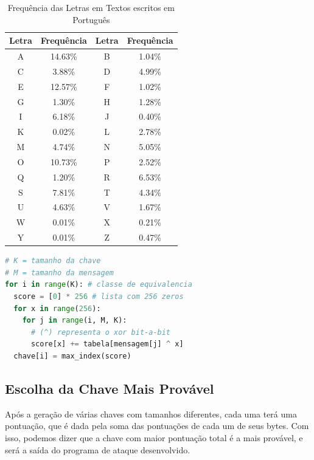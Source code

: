 \documentclass[conference]{IEEEtran}
\begin{document}
\begin{table}[htbp]
\caption{Frequência das Letras em Textos escritos em Português}
\begin{center}
\begin{tabular}{|c|c|c|c|}
\hline
    Letra & Frequência & Letra & Frequência \\
\hline
    A & 14.63\% & B & 1.04\% \\
    C & 3.88\% & D & 4.99\% \\
    E & 12.57\% & F & 1.02\% \\
    G & 1.30\% & H & 1.28\% \\
    I & 6.18\% & J & 0.40\% \\
    K & 0.02\% & L & 2.78\% \\
    M & 4.74\% & N & 5.05\% \\
    O & 10.73\% & P & 2.52\% \\
    Q & 1.20\% & R & 6.53\% \\
    S & 7.81\% & T & 4.34\% \\
    U & 4.63\% & V & 1.67\% \\
    W & 0.01\% & X & 0.21\% \\
    Y & 0.01\% & Z & 0.47\% \\
\hline
\end{tabular}
\label{tab:portuguesefrequency}
\end{center}
\end{table}

\begin{lstlisting}[language=Python, caption=Cálculo da pontuação para um tamanho
de chave K]
# K = tamanho da chave
# M = tamanho da mensagem
for i in range(K): # classe de equivalencia
  score = [0] * 256 # lista com 256 zeros
  for x in range(256):
    for j in range(i, M, K):
      # (^) representa o xor bit-a-bit
      score[x] += tabela[mensagem[j] ^ x]
  chave[i] = max_index(score)
\end{lstlisting}
\label{code:idk}

\subsection{Escolha da Chave Mais Provável}
\label{sec:escolha}
Após a geração de várias chaves com tamanhos diferentes, cada uma terá uma
pontuação, que é dada pela soma das pontuações de cada um de seus bytes. Com
isso, podemos dizer que a chave com maior pontuação total é a mais provável, e
será a saída do programa de ataque desenvolvido. 
\end{document}
